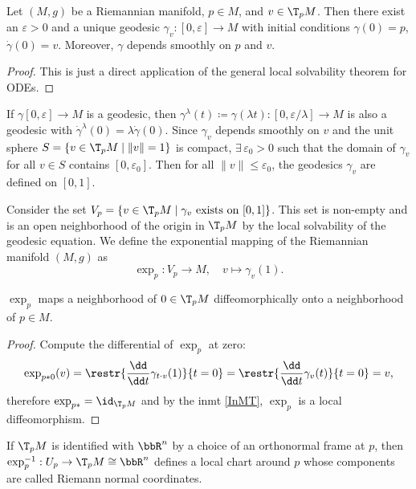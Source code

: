\begin{lem}
    Let $(M,g)$ be a Riemannian manifold, $p\in M$, and $v\in \T_p M$. Then there exist an $\varepsilon>0$ and a unique geodesic $\gamma_v:[0,\varepsilon]\to M$ with initial conditions $\gamma(0)=p$, $\dot\gamma(0)=v$. Moreover, $\gamma $ depends smoothly on $p$ and $v$.
\end{lem}
\begin{proof}
    This is just a direct application of the general local solvability theorem for ODEs.
\end{proof}
\begin{cor}
    If $\gamma[0,\varepsilon]\to M$ is a geodesic, then $\gamma^\lambda(t)\coloneqq \gamma(\lambda t):[0,\varepsilon/\lambda]\to M$ is also a geodesic with $\dot\gamma^\lambda(0)=\lambda\dot\gamma(0)$. Since $\gamma_v$ depends smoothly on $v$ and the unit sphere $S=\{v\in \T_pM\mid \lVert v\rVert=1\}$ is compact, $\exists\,\varepsilon_0>0$ such that the domain of $\gamma_v$ for all $v\in S$ contains $[0,\varepsilon_0]$. Then for all $\lVert v\rVert\leq \varepsilon_0$, the geodesics $\gamma_v$ are defined on $[0,1]$.
\end{cor}
\begin{defn}
    Consider the set $V_p=\{v\in \T_p M\mid \gamma_v \text{ exists on }[0,1]\}$. This set is non-empty and is an open neighborhood of the origin in $\T_p M$ by the local solvability of the geodesic equation. We define the exponential mapping of the Riemannian manifold $(M,g)$ as
    \[\exp_p :V_p\to M,\quad v\mapsto \gamma_v(1).\]
\end{defn}

\begin{thm}
    $\exp_p$ maps a neighborhood of $0\in \T_pM$ diffeomorphically onto a neighborhood of $p\in M$.
\end{thm}
\begin{proof}
    Compute the differential of $\exp_p$ at zero:
    \[\exp_{p\ast0}(v)=\restr{\frac{\dd}{\dd t}\gamma_{t\cdot v}(1)}{t=0}=\restr{\frac{\dd}{\dd t}\gamma_{v}(t)}{t=0}=v,\]
    therefore $\exp_{p\ast}=\id_{\T_p M}$ and by the \gls{inmt} \ref{InMT}, $\exp_p$ is a local diffeomorphism.
\end{proof}

\begin{defn}
    If $\T_p M$ is identified with $\bbR^n$ by a choice of an orthonormal frame at $p$, then $\exp_p^{-1}:U_p\to \T_p M\cong\bbR^n$ defines a local chart around $p$ whose components are called Riemann normal coordinates.
\end{defn}

